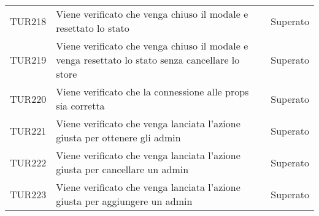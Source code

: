 \documentclass[PianoDiQualifica.tex]{subfiles}
\begin{document}
\begin{longtable}[H]{P{2cm}P{8.5cm}P{3cm}}
	TUR218 & Viene verificato che venga chiuso il modale e resettato lo stato & Superato \\
	TUR219 & Viene verificato che venga chiuso il modale e venga resettato lo stato senza cancellare lo store & Superato \\
	TUR220 & Viene verificato che la connessione alle props sia corretta & Superato \\
	TUR221 & Viene verificato che venga lanciata l'azione giusta per ottenere gli admin & Superato \\
	TUR222 & Viene verificato che venga lanciata l'azione giusta per cancellare un admin & Superato \\
	TUR223 & Viene verificato che venga lanciata l'azione giusta per aggiungere un admin & Superato \\


\end{longtable}
\end{document}
